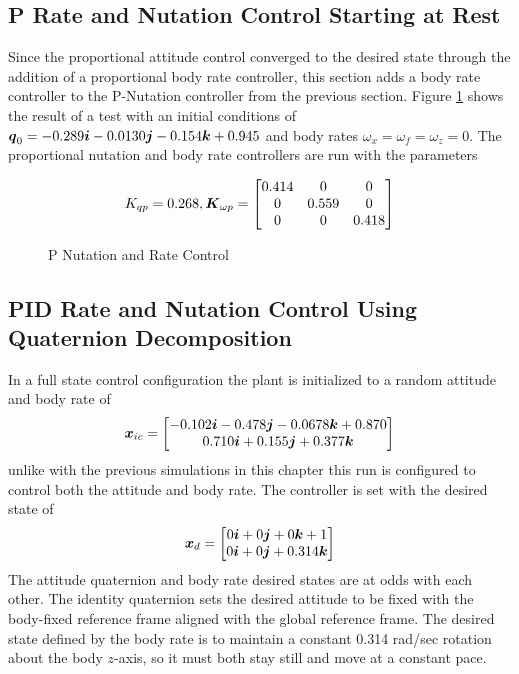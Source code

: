 \subsection{P Rate and Nutation Control Starting at Rest}
\label{subsec:PRateNutationControlStartingatRest}

Since the proportional attitude control converged to the desired state through the addition of a proportional body rate controller, this section adds a body rate controller to the P-Nutation controller from the previous section.  Figure \ref{fig:PNutationRateControl} shows the result of a test with an initial conditions of $\boldsymbol{q}_0 = -0.289\boldsymbol{i} -0.0130 \boldsymbol{j} -0.154 \boldsymbol{k} + 0.945$ and body rates $\omega_x = \omega_f = \omega_z = 0$.  The proportional nutation and body rate controllers are run with the parameters

\begin{equation}
  K_{qp} = 0.268, \boldsymbol{K}_{\omega p} = \begin{bmatrix} 0.414 & 0 & 0 \\ 0 & 0.559 & 0 \\ 0 & 0 & 0.418 \end{bmatrix}
\end{equation}

\begin{figure}[H]
  \centerline{}
  \caption{P Nutation and Rate Control}
  \label{fig:PNutationRateControl}
\end{figure}

\subsection{PID Rate and Nutation Control Using Quaternion Decomposition}
\label{subsec:PIDRateandNutationControl}
In a full state control configuration the plant is initialized to a random attitude and body rate of
\begin{equation}
  \boldsymbol{x}_{ic} = \begin{bmatrix} -0.102 \boldsymbol{i} -0.478 \boldsymbol{j}-0.0678 \boldsymbol{k} + 0.870 \\ 0.710 \boldsymbol{i} + 0.155 \boldsymbol{j} + 0.377 \boldsymbol{k} \end{bmatrix}
\end{equation}
unlike with the previous simulations in this chapter this run is configured to control both the attitude and body rate.  The controller is set with the desired state of
\begin{equation}
  \boldsymbol{x}_d = \begin{bmatrix} 0 \boldsymbol{i} +0 \boldsymbol{j} +0 \boldsymbol{k} + 1 \\ 0 \boldsymbol{i} + 0 \boldsymbol{j} + 0.314 \boldsymbol{k} \end{bmatrix}
\end{equation}
The attitude quaternion and body rate desired states are at odds with each other.  The identity quaternion sets the desired attitude to be fixed with the body-fixed reference frame aligned with the global reference frame.  The desired state defined by the body rate is to maintain a constant 0.314 rad/sec rotation about the body $z$-axis, so it must both stay still and move at a constant pace.


